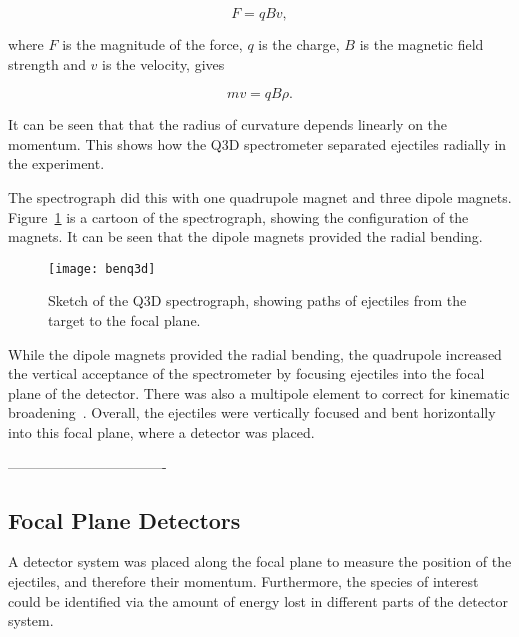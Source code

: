 \begin{equation}
	F = qBv\mathrm{,}
\end{equation}

where $F$ is the magnitude of the force, $q$ is the charge, $B$ is the magnetic field strength and $v$ is the velocity, gives 

\begin{equation}
	mv = qB\rho\mathrm{.}
\end{equation}

It can be seen that that the radius of curvature depends linearly on the momentum. This shows how the Q3D spectrometer separated ejectiles radially in the experiment.

The spectrograph did this with one quadrupole magnet and three dipole magnets. Figure~\ref{Q3D} is a cartoon of the spectrograph, showing the configuration of the magnets. It can be seen that the dipole magnets provided the radial bending.
 
\begin{figure}[h]	
\hspace*{-0.5cm}
\begin{center}	
	\texttt{[image: benq3d]}
\end{center}
			\caption[Schematic diagram of the Q3D magnetic spectrograph]{Sketch of the Q3D spectrograph, showing paths of ejectiles from the target to the focal plane.~\cite{dollingerfaestermann}}
		\label{Q3D}
\end{figure}
\FloatBarrier

While the dipole magnets provided the radial bending, the quadrupole increased the vertical acceptance of the spectrometer by focusing ejectiles into the focal plane of the detector. There was also a multipole element to correct for kinematic broadening~\cite{scheerer}. Overall, the ejectiles were vertically focused and bent horizontally into this focal plane, where a detector was placed.

 ----------------------------------
\subsection{Focal Plane Detectors}

A detector system was placed along the focal plane to measure the position of the ejectiles, and therefore their momentum. Furthermore, the species of interest could be identified via the amount of energy lost in different parts of the detector system. 


